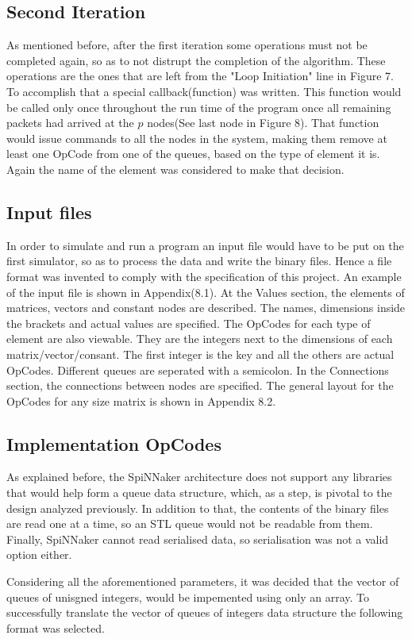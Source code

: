 \documentclass[12pt,a4paper]{article}
\begin{document}
\subsection{Second Iteration}
As mentioned before, after the first iteration some operations must not be completed again, so as to not distrupt the completion of the algorithm. These operations are the ones that are left from the "Loop Initiation" line in Figure 7. To accomplish that a special callback(function) was written. This function would be called only once throughout the run time of the program once all remaining packets had arrived at the $p$ nodes(See last node in Figure 8). That function would issue commands to all the nodes in the system, making them remove at least one OpCode from one of the queues, based on the type of element it is. Again the name of the element was considered to make that decision.
\subsection{Input files}
In order to simulate and run a program an input file would have to be put on the first simulator, so as to process the data and write the binary files. Hence a file format was invented to comply with the specification of this project. An example of the input file is shown in Appendix(8.1). At the Values section, the elements of matrices, vectors and constant nodes are described. The names, dimensions inside the brackets and actual values are specified. The OpCodes for each type of element are also viewable. They are the integers next to the dimensions of each matrix/vector/consant. The first integer is the key and all the others are actual OpCodes. Different queues are seperated with a semicolon. In the Connections section, the connections between nodes are specified. The general layout for the OpCodes for any size matrix  is shown in Appendix 8.2.
\subsection{Implementation OpCodes}
As explained before, the SpiNNaker architecture does not support any libraries that would help form a queue data structure, which, as a step, is pivotal to the design analyzed previously. In addition to that, the contents of the binary files are read one at a time, so an STL queue would not be readable from them. Finally, SpiNNaker cannot read serialised data, so serialisation was not a valid option either.

Considering all the aforementioned parameters, it was decided that the vector of queues of unisgned integers, would be impemented using only an array. To successfully translate the vector of queues of integers data structure the following format was selected.
\end{document}
